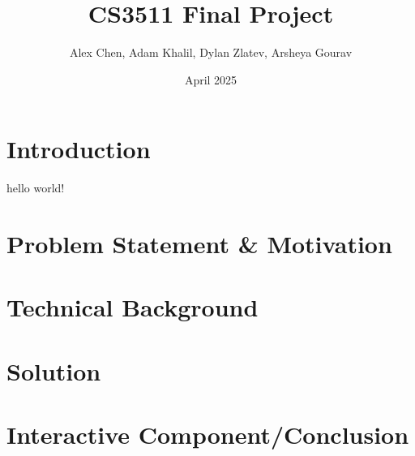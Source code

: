 \documentclass{article}
\title{CS3511 Final Project}
\author{Alex Chen, Adam Khalil, Dylan Zlatev, Arsheya Gourav}
\date{April 2025}
\begin{document}
\maketitle

\section{Introduction}
hello world!
\section{Problem Statement \& Motivation}
\section{Technical Background}
\section{Solution}
\section{Interactive Component/Conclusion}
\end{document}
